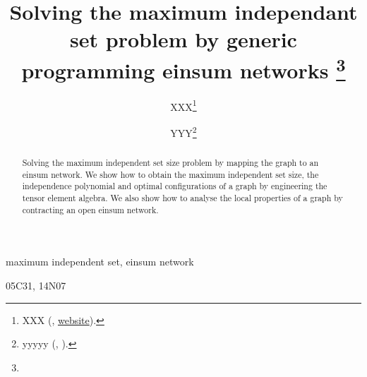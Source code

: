\documentclass[review,onefignum,onetabnum]{siamart190516}
\title{Solving the maximum independant set problem by generic programming einsum networks
\thanks{\funding{...}}
}
\author{XXX\thanks{XXX 
  (\email{email}, \url{website}).}
\and YYY\thanks{yyyyy 
  (\email{yyyy}, \email{email}).}
}
\newcommand{\<}{\langle}
\renewcommand{\>}{\rangle}
\begin{document}
\maketitle

\begin{abstract}
	Solving the maximum independent set size problem by mapping the graph to an einsum network. 
    We show how to obtain the maximum independent set size, the independence polynomial and optimal configurations of a graph by engineering the tensor element algebra.
    We also show how to analyse the local properties of a graph by contracting an open einsum network.
\end{abstract}

\begin{keywords}
  maximum independent set, einsum network
\end{keywords}

\begin{AMS}
  05C31, 14N07
\end{AMS}
\end{document}
